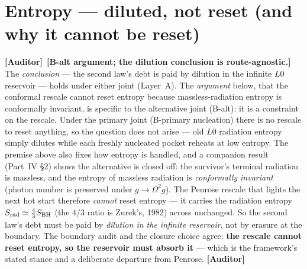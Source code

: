 \documentclass[11pt]{article}
\newcommand{\Auditor}{\textbf{\textcolor{teal!55!black}{[Auditor]}}}
\begin{document}
\section{Entropy --- diluted, not reset (and why it cannot be reset)}
\noindent\Auditor\ \textbf{[B-alt argument; the dilution conclusion is route-agnostic.]} The \emph{conclusion} --- the second law's debt is paid by dilution in the infinite $L0$ reservoir --- holds under either joint (Layer~A). The \emph{argument} below, that the conformal rescale cannot reset entropy because massless-radiation entropy is conformally invariant, is specific to the alternative joint (B-alt): it is a constraint on the rescale. Under the primary joint (B-primary nucleation) there is no rescale to reset anything, so the question does not arise --- old $L0$ radiation entropy simply dilutes while each freshly nucleated pocket reheats at low entropy.
The premise above also fixes how entropy is handled, and a companion result (Part~IV \S2) shows the alternative is closed off: the survivor's terminal radiation is massless, and the entropy of massless radiation is \emph{conformally invariant} (photon number is preserved under $g\!\to\!\Omega^2 g$). The Penrose rescale that lights the next hot start therefore \emph{cannot} reset entropy --- it carries the radiation entropy $S_{\rm rad}\simeq\tfrac43 S_{\rm BH}$ (the $4/3$ ratio is Zurek's, 1982) across unchanged. So the second law's debt must be paid by \emph{dilution in the infinite reservoir}, not by erasure at the boundary. The boundary audit and the closure choice agree: \textbf{the rescale cannot reset entropy, so the reservoir must absorb it} --- which is the framework's stated stance and a deliberate departure from Penrose. \Auditor

\end{document}
